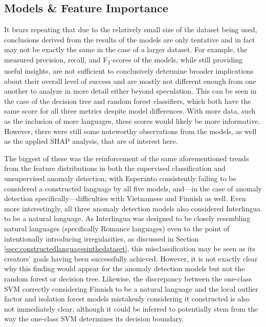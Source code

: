 \documentclass[12pt,a4paper]{article}
\numberwithin{figure}{section}
\numberwithin{table}{section}
\numberwithin{definition}{section}
\begin{document}


\subsection{Models \& Feature Importance}
\label{ssec:modelsandfeatureimportance}

It bears repeating that due to the relatively small size of the dataset being used, conclusions derived from the results of the models are only tentative and in fact may not be exactly the same in the case of a larger dataset. For example, the measured precision, recall, and F\textsubscript{1}-scores of the models, while still providing useful insights, are not sufficient to conclusively determine broader implications about their overall level of success and are mostly not different enough from one another to analyze in more detail either beyond speculation. This can be seen in the case of the decision tree and random forest classifiers, which both have the same score for all three metrics despite model differences. With more data, such as the inclusion of more languages, these scores would likely be more informative. However, there were still some noteworthy observations from the models, as well as the applied SHAP analysis, that are of interest here.

The biggest of these was the reinforcement of the same aforementioned trends from the feature distributions in both the supervised classification and unsupervised anomaly detection, with Esperanto consistently failing to be considered a constructed language by all five models, and---in the case of anomaly detection specifically---difficulties with Vietnamese and Finnish as well. Even more interestingly, all three anomaly detection models also considered Interlingua to be a natural language. As Interlingua was designed to be closely resembling natural languages (specifically Romance languages) even to the point of intentionally introducing irregularities, as discussed in Section \ref{ssec:constructedlanguagesinthedataset}, this misclassification may be seen as its creators' goals having been successfully achieved. However, it is not exactly clear why this finding would appear for the anomaly detection models but not the random forest or decision tree. Likewise, the discrepancy between the one-class SVM correctly considering Finnish to be a natural language and the local outlier factor and isolation forest models mistakenly considering it constructed is also not immediately clear, although it could be inferred to potentially stem from the way the one-class SVM determines its decision boundary. %
\end{document}
